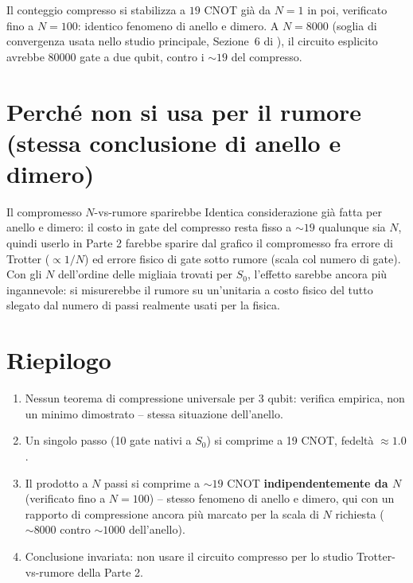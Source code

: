 \documentclass[11pt,a4paper]{article}
\begin{document}
Il conteggio compresso si stabilizza a $19$ CNOT già da $N=1$ in poi,
verificato fino a $N=100$: identico fenomeno di anello e dimero. A
$N=8000$ (soglia di convergenza usata nello studio principale, Sezione~6 di
\texttt{}), il
circuito esplicito avrebbe $80000$ gate a due qubit, contro i $\sim19$ del
compresso.

\section{Perché non si usa per il rumore (stessa conclusione di anello e dimero)}

\begin{warnbox}{Il compromesso $N$-vs-rumore sparirebbe}
Identica considerazione già fatta per anello e dimero: il costo in gate del
compresso resta fisso a $\sim19$ qualunque sia $N$, quindi userlo in Parte 2
farebbe sparire dal grafico il compromesso fra errore di Trotter
($\propto1/N$) ed errore fisico di gate sotto rumore (scala col numero di
gate). Con gli $N$ dell'ordine delle migliaia trovati per $S_0$, l'effetto
sarebbe ancora più ingannevole: si misurerebbe il rumore su un'unitaria a
costo fisico del tutto slegato dal numero di passi realmente usati per la
fisica.
\end{warnbox}

\section{Riepilogo}

\begin{enumerate}[leftmargin=1.4em,itemsep=0.3em]
\item Nessun teorema di compressione universale per 3 qubit: verifica
empirica, non un minimo dimostrato -- stessa situazione dell'anello.
\item Un singolo passo (10 gate nativi a $S_0$) si comprime a 19 CNOT,
fedeltà $\approx1.0$.
\item Il prodotto a $N$ passi si comprime a $\sim19$ CNOT
\textbf{indipendentemente da $N$} (verificato fino a $N=100$) -- stesso
fenomeno di anello e dimero, qui con un rapporto di compressione ancora
più marcato per la scala di $N$ richiesta ($\sim8000$ contro $\sim1000$
dell'anello).
\item Conclusione invariata: non usare il circuito compresso per lo studio
Trotter-vs-rumore della Parte 2.
\end{enumerate}
\end{document}
